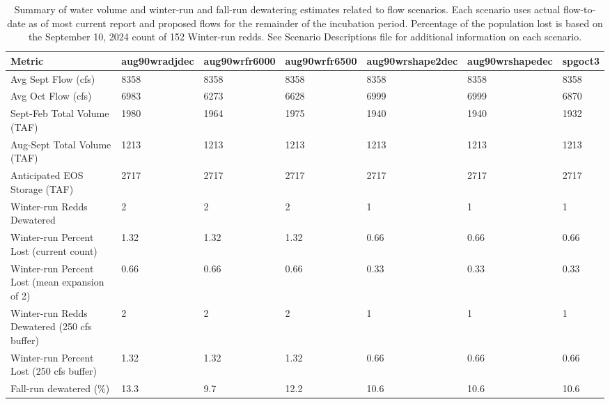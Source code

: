 \documentclass[
]{article}
\begin{document}
\begin{table}

\caption{\label{tab:unnamed-chunk-8}Summary of water volume and winter-run and fall-run dewatering estimates related to flow scenarios. Each scenario uses actual flow-to-date as of most current report and proposed flows for the remainder of the incubation period. Percentage of the population lost is based on the September 10, 2024 count of 152 Winter-run redds. See Scenario Descriptions file for additional information on each scenario.}
\centering
\fontsize{8}{10}\selectfont
\begin{tabular}[t]{>{\raggedright\arraybackslash}p{4cm}|l|l|l|l|l|l}
\hline
Metric & aug90wradjdec & aug90wrfr6000 & aug90wrfr6500 & aug90wrshape2dec & aug90wrshapedec & spgoct3\\
\hline
Avg Sept Flow (cfs) & 8358 & 8358 & 8358 & 8358 & 8358 & 8358\\
\hline
Avg Oct Flow (cfs) & 6983 & 6273 & 6628 & 6999 & 6999 & 6870\\
\hline
Sept-Feb Total Volume (TAF) & 1980 & 1964 & 1975 & 1940 & 1940 & 1932\\
\hline
Aug-Sept Total Volume (TAF) & 1213 & 1213 & 1213 & 1213 & 1213 & 1213\\
\hline
Anticipated EOS Storage (TAF) & 2717 & 2717 & 2717 & 2717 & 2717 & 2717\\
\hline
Winter-run Redds Dewatered & 2 & 2 & 2 & 1 & 1 & 1\\
\hline
Winter-run Percent Lost (current count) & 1.32 & 1.32 & 1.32 & 0.66 & 0.66 & 0.66\\
\hline
Winter-run Percent Lost (mean expansion of 2) & 0.66 & 0.66 & 0.66 & 0.33 & 0.33 & 0.33\\
\hline
Winter-run Redds Dewatered (250 cfs buffer) & 2 & 2 & 2 & 1 & 1 & 1\\
\hline
Winter-run Percent Lost (250 cfs buffer) & 1.32 & 1.32 & 1.32 & 0.66 & 0.66 & 0.66\\
\hline
Fall-run dewatered (\%) & 13.3 & 9.7 & 12.2 & 10.6 & 10.6 & 10.6\\
\hline
\end{tabular}
\end{table}
\end{document}
